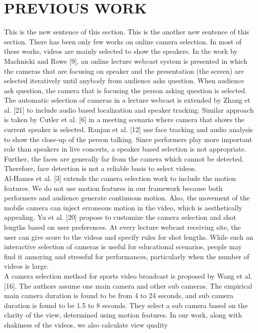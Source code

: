 \documentclass{sig-alternate}
\begin{document}
{{{\section{PREVIOUS WORK}
This is the new sentence of this section.
This is the another new sentence of this section.
There has been only few works on online camera selection. In
most of these works, videos are mainly selected to show the speakers.
In the work by Machnicki and Rowe [9], an online lecture
webcast system is presented in which the cameras that are focusing
on speaker and the presentation (the screen) are selected iteratively
until anybody from audience asks question. When audience ask
question, the camera that is focusing the person asking question is
selected. The automatic selection of cameras in a lecture webcast
is extended by Zhang et al. [21] to include audio based localization
and speaker tracking. Similar approach is taken by Cutler et al. [6]
in a meeting scenario where camera that shows the current speaker
is selected. Ranjan et al. [12] use face tracking and audio analysis
to show the close-up of the person talking. Since performers
play more important role than speakers in live concerts, a speaker
based selection is not appropriate. Further, the faces are generally
far from the camera which cannot be detected. Therefore, face detection
is not a reliable basis to select videos.\\
Al-Hames et al. [3] extends the camera selection work to include
the motion features. We do not use motion features in our framework
because both performers and audience generate continuous
motion. Also, the movement of the mobile camera can inject erroneous
motion in the video, which is aesthetically appealing. Yu et
al. [20] propose to customize the camera selection and shot lengths
based on user preferences. At every lecture webcast receiving site,
the user can give score to the videos and specify rules for shot
lengths. While such an interactive selection of cameras is useful
for educational scenarios, people may find it annoying and stressful
for performances, particularly when the number of videos is
large.\\
A camera selection method for sports video broadcast is proposed
by Wang et al. [16]. The authors assume one main camera
and other sub cameras. The empirical main camera duration is
found to be from 4 to 24 seconds, and sub camera duration is found
to be 1.5 to 8 seconds. They select a sub camera based on the clarity
of the view, determined using motion features. In our work,
along with shakiness of the videos, we also calculate view quality
}}}
\end{document}
